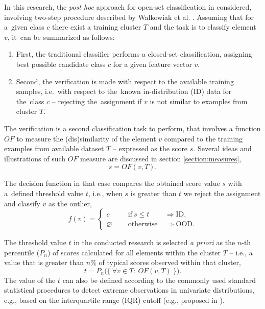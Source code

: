 In this research, the \textit{post hoc} approach for open-set classification in considered, involving two-step procedure described by Walkowiak et al. \cite{Walkowiak-2018-asmbi}. Assuming that for a~given class $c$ there exist a training cluster $T$ and the task is to classify element $v$, it~can be summarized as follows:
\vspace{-0.5\baselineskip}
\begin{enumerate}
    \item First, the traditional classifier performs a closed-set classification, assigning best possible candidate class $c$ for a given feature vector $v$.
    \item Second, the verification is made with respect to the available training samples, i.e.~with respect to the~known in-distribution (ID) data for the~class $c$ – rejecting the~assignment if $v$ is not similar to examples from cluster $T$.
\end{enumerate}

The verification is a second classification task to perform, that involves a function $OF$ to measure the (dis)similarity of the element $v$ compared to the training examples from available dataset $T$ – expressed as the score $s$. Several ideas and illustrations of such $OF$ measure are discussed in section \ref{section:measures},
\begin{equation}
    s = OF(v, T).
    \label{eq:score}
\end{equation}

The decision function in that case compares the obtained score value $s$ with a~defined threshold value $t$, i.e., when $s$ is greater than $t$ we reject the assignment and classify $v$ as the outlier,
\begin{equation}
    f(v)
    =
    \left\{
        \begin{array}{lll}
            c
                ~\quad~ &
                \mathrm{if} ~ s \leq t
                ~ &
                \Rightarrow \mathrm{ID},
                \\
            \varnothing
                ~\quad~ &
                \mathrm{otherwise}
                ~ &
                \Rightarrow \mathrm{OOD}.
        \end{array}
    \right.
    \label{eq:open-set-classification}
\end{equation}

The threshold value $t$ in the conducted research is selected \textit{a priori} as the $n$-th percentile ($P_n$) of scores calculated for all elements within the cluster $T$ – i.e., a value that is greater than $n\%$ of typical scores observed within that cluster,
\begin{equation}
    t = {P_n}\Big(
        \big\{
            ~
            \forall v \in T:
            ~
            OF(v, T)
            ~
        \big\}
    \Big).
    \label{eq:threshold}
\end{equation}
The value of the $t$ can also be defined according to the commonly used standard statistical procedures to detect extreme observations in univariate distributions, e.g., based on the interquartile range (IQR) cutoff (e.g., proposed in \cite{Tukey-1977}\cite{Walkowiak-2018-asmbi}).


